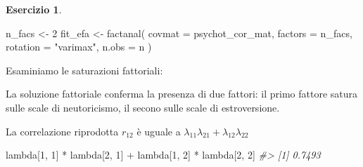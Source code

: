 \documentclass[
  11pt,
]{krantz}
\makeatletter
\newenvironment{Shaded}{\begin{snugshade}}{\end{snugshade}}
\newcommand{\AttributeTok}[1]{\textcolor[rgb]{0.61,0.61,0.61}{#1}}
\newcommand{\CommentTok}[1]{\textcolor[rgb]{0.37,0.37,0.37}{\textit{#1}}}
\newcommand{\DecValTok}[1]{\textcolor[rgb]{0.06,0.06,0.06}{#1}}
\newcommand{\FunctionTok}[1]{\textcolor[rgb]{0,0,0}{#1}}
\newcommand{\NormalTok}[1]{#1}
\newcommand{\OtherTok}[1]{\textcolor[rgb]{0.37,0.37,0.37}{#1}}
\newcommand{\SpecialCharTok}[1]{\textcolor[rgb]{0,0,0}{#1}}
\newcommand{\StringTok}[1]{\textcolor[rgb]{0.5,0.5,0.5}{#1}}
\newenvironment{kframe}{%
\medskip{}
\setlength{\fboxsep}{.8em}
 \def\at@end@of@kframe{}%
 \ifinner\ifhmode%
  \def\at@end@of@kframe{\end{minipage}}%
  \begin{minipage}{\columnwidth}%
 \fi\fi%
 \def\FrameCommand##1{\hskip\@totalleftmargin \hskip-\fboxsep
 \colorbox{shadecolor}{##1}\hskip-\fboxsep
     \hskip-\linewidth \hskip-\@totalleftmargin \hskip\columnwidth}%
 \MakeFramed {\advance\hsize-\width
   \@totalleftmargin\z@ \linewidth\hsize
   \@setminipage}}%
 {\par\unskip\endMakeFramed%
 \at@end@of@kframe}
\renewenvironment{Shaded}{\begin{kframe}}{\end{kframe}}
\theoremstyle{definition}
\theoremstyle{definition}
\theoremstyle{definition}
\newtheorem{exercise}{Esercizio}[chapter]
\theoremstyle{definition}
\theoremstyle{remark}
\makeatother
\begin{document}
\begin{exercise}
\begin{Shaded}
\begin{Highlighting}[]
\NormalTok{n\_facs }\OtherTok{\textless{}{-}} \DecValTok{2}
\NormalTok{fit\_efa }\OtherTok{\textless{}{-}} \FunctionTok{factanal}\NormalTok{(}
  \AttributeTok{covmat =}\NormalTok{ psychot\_cor\_mat,}
  \AttributeTok{factors =}\NormalTok{ n\_facs,}
  \AttributeTok{rotation =} \StringTok{"varimax"}\NormalTok{,}
  \AttributeTok{n.obs =}\NormalTok{ n}
\NormalTok{)}
\end{Highlighting}
\end{Shaded}

Esaminiamo le saturazioni fattoriali:

\begin{Shaded}
\end{Shaded}

La soluzione fattoriale conferma la presenza di due fattori: il primo fattore satura sulle scale di neutoricismo, il secono sulle scale di estroversione.

La correlazione riprodotta \(r_{12}\) è uguale a \(\lambda_{11}\lambda_{21} + \lambda_{12}\lambda_{22}\)

\begin{Shaded}
\begin{Highlighting}[]
\NormalTok{lambda[}\DecValTok{1}\NormalTok{, }\DecValTok{1}\NormalTok{] }\SpecialCharTok{*}\NormalTok{ lambda[}\DecValTok{2}\NormalTok{, }\DecValTok{1}\NormalTok{] }\SpecialCharTok{+}\NormalTok{ lambda[}\DecValTok{1}\NormalTok{, }\DecValTok{2}\NormalTok{] }\SpecialCharTok{*}\NormalTok{ lambda[}\DecValTok{2}\NormalTok{, }\DecValTok{2}\NormalTok{]}
\CommentTok{\#\textgreater{} [1] 0.7493}
\end{Highlighting}
\end{Shaded}


\end{exercise}
\end{document}
